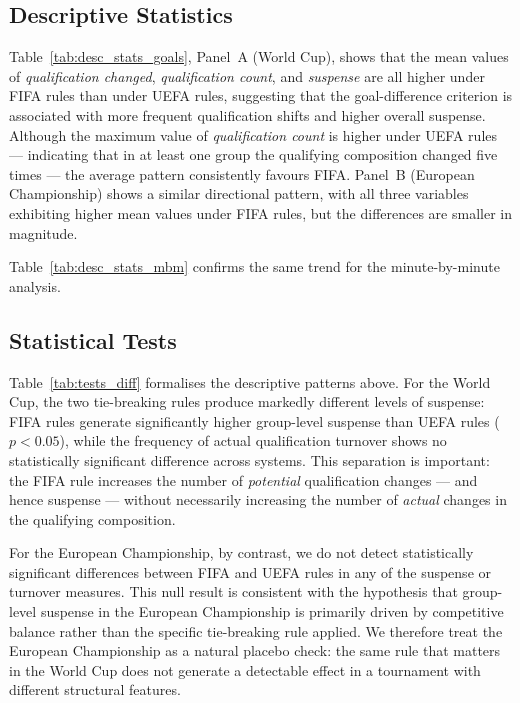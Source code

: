 \documentclass[11pt]{article}
\begin{document}
\subsection{Descriptive Statistics}




Table~\ref{tab:desc_stats_goals}, Panel~A (World Cup), shows that the mean values of \textit{qualification changed}, \textit{qualification count}, and \textit{suspense} are all higher under FIFA rules than under UEFA rules, suggesting that the goal-difference criterion is associated with more frequent qualification shifts and higher overall suspense. Although the maximum value of \textit{qualification count} is higher under UEFA rules — indicating that in at least one group the qualifying composition changed five times — the average pattern consistently favours FIFA. Panel~B (European Championship) shows a similar directional pattern, with all three variables exhibiting higher mean values under FIFA rules, but the differences are smaller in magnitude.

Table~\ref{tab:desc_stats_mbm} confirms the same trend for the minute-by-minute analysis.


\subsection{Statistical Tests}



Table~\ref{tab:tests_diff} formalises the descriptive patterns above. For the World Cup, the two tie-breaking rules produce markedly different levels of suspense: FIFA rules generate significantly higher group-level suspense than UEFA rules ($p < 0.05$), while the frequency of actual qualification turnover shows no statistically significant difference across systems. This separation is important: the FIFA rule increases the number of \textit{potential} qualification changes — and hence suspense — without necessarily increasing the number of \textit{actual} changes in the qualifying composition.

For the European Championship, by contrast, we do not detect statistically significant differences between FIFA and UEFA rules in any of the suspense or turnover measures. This null result is consistent with the hypothesis that group-level suspense in the European Championship is primarily driven by competitive balance rather than the specific tie-breaking rule applied. We therefore treat the European Championship as a natural placebo check: the same rule that matters in the World Cup does not generate a detectable effect in a tournament with different structural features.
\end{document}
